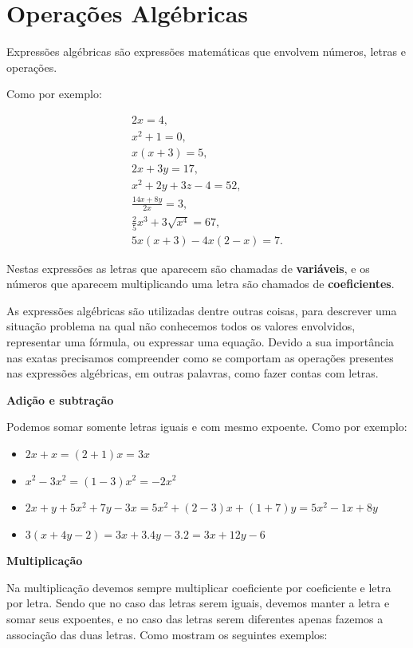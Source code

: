  \chapter{Operações Algébricas}

 Expressões algébricas são expressões matemáticas que envolvem números, letras e operações.

 Como por exemplo:

 \begin{eqnarray*}
  2x=4,\\
  x^2+1=0,\\
  x(x+3)=5,\\
  2x+3y=17,\\
  x^2 + 2y + 3z -4= 52, \\
  \frac{14x + 8y}{2x}= 3, \\
  \frac{2}{5}x^3 + 3\sqrt{x^4}= 67, \\
  5x(x+3)-4x(2-x)=7.
 \end{eqnarray*}

 Nestas expressões as letras que aparecem são chamadas de \textbf{variáveis}, e os números que aparecem multiplicando uma letra são chamados de \textbf{coeficientes}.

 As expressões algébricas são utilizadas dentre outras coisas, para descrever uma situação problema na qual não conhecemos todos os valores envolvidos, representar uma fórmula, ou expressar uma equação. Devido a sua importância nas exatas precisamos compreender como se comportam as operações presentes nas expressões algébricas, em outras palavras, como fazer contas com letras.

 \vskip0.3cm

 \textbf{Adição e subtração}

 Podemos somar somente letras iguais e com mesmo expoente. Como por exemplo:

 \begin{itemize}
  \item $2x + x= (2+1)x= 3x$
  \item $x^2 - 3x^2= (1-3)x^2= -2x^2$
  \item $2x + y + 5x^2 + 7y - 3x= 5x^2 + (2-3)x + (1+7)y= 5x^2 - 1x + 8y$
  \item $3(x+ 4y-2)= 3x + 3.4y - 3.2= 3x + 12y - 6$
 \end{itemize}

  \vskip0.3cm

 \textbf{Multiplicação}

 Na multiplicação devemos sempre multiplicar coeficiente por coeficiente e letra por letra. Sendo que no caso das letras serem iguais, devemos manter a letra e somar seus expoentes, e no caso das letras serem diferentes apenas fazemos a associação das duas letras. Como mostram os seguintes exemplos:

